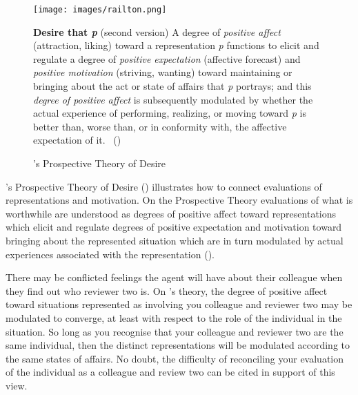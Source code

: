 \documentclass[10pt]{article}
\begin{document}
\begin{figure}[t!]
  \centering
  \texttt{[image: images/railton.png]}

  \captionsetup{singlelinecheck=off,font=small}
  \caption*{
    \textbf{Desire that \emph{p}} (second version) \newline
    A degree of \emph{positive affect} (attraction, liking) toward a representation \emph{p} functions to elicit and regulate a degree of \emph{positive expectation} (affective forecast) and \emph{positive motivation} (striving, wanting) toward maintaining or bringing about the act or state of affairs that \emph{p} portrays; and this \emph{degree of positive affect} is subsequently modulated by whether the actual experience of performing, realizing, or moving toward \emph{p} is better than, worse than, or in conformity with, the affective expectation of it.\nolinebreak
    \mbox{ }\hfill(\cite[35,36]{Railton:2012aa})
  }
  \captionsetup{singlelinecheck=on,font=normal}
  \caption{\citeauthor{Railton:2012aa}'s Prospective Theory of Desire}
\end{figure}

\citeauthor{Railton:2012aa}'s Prospective Theory of Desire (\citeyear{Railton:2012aa}) illustrates how to connect evaluations of representations and motivation.
On the Prospective Theory evaluations of what is worthwhile are understood as degrees of positive affect toward representations which elicit and regulate degrees of positive expectation and motivation toward bringing about the represented situation which are in turn modulated by actual experiences associated with the representation (\citeyear[36]{Railton:2012aa}).

There may be conflicted feelings the agent will have about their colleague when they find out who reviewer two is.
On \citeauthor{Railton:2012aa}'s theory, the degree of positive affect toward situations represented as involving you colleague and reviewer two may be modulated to converge, at least with respect to the role of the individual in the situation.
So long as you recognise that your colleague and reviewer two are the same individual, then the distinct representations will be modulated according to the same states of affairs.
No doubt, the difficulty of reconciling your evaluation of the individual as a colleague and review two can be cited in support of this view.
\end{document}

